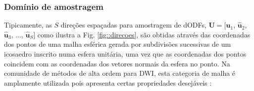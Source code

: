 \documentclass[
    12pt,                %
    oneside,            %
    a4paper,            %
    english,            %
    french,                %
    spanish,            %
    brazil                %
    ]{abntex2}
\begin{document}



\subsubsection{Domínio de amostragem}
\label{ssec::dominio_esferico}

Tipicamente, as $S$ direções espaçadas para amostragem de dODFs,
$\mathbf{U} = [
\mathbf{\hat{u}}_1$, 
$\mathbf{\hat{u}}_2$, 
$\mathbf{\hat{u}}_3$, ..., 
$\mathbf{\hat{u}}_S]$ como ilustra a Fig. \ref{fig::direcoes}, são obtidas através das coordenadas dos pontos de uma malha esférica gerada por subdivisões sucessivas de um icosaedro inscrito numa esfera unitária, uma vez que as coordenadas dos pontos coincidem com as coordenadas dos vetores normais da esfera no ponto. Na comunidade de métodos de alta ordem para DWI, esta categoria de malha é amplamente utilizada \cite{yeh2010, TuchQBall2004, descoteaux2007} pois apresenta certas propriedades desejáveis  \cite{popko2012}:
\end{document}
